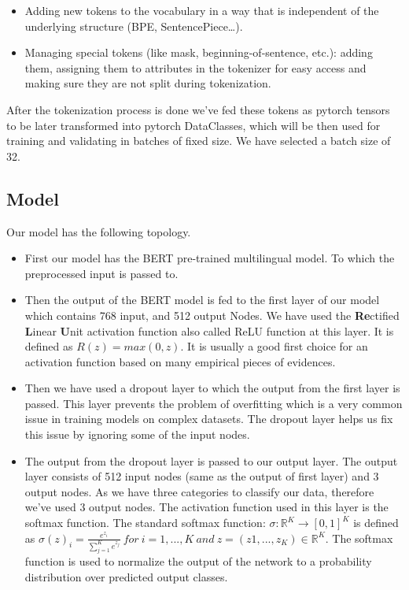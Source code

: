 \documentclass[a4paper, 12pt]{article}
\begin{document}
\begin{sloppypar}
\begin{itemize}
\item{Adding new tokens to the vocabulary in a way that is independent of the underlying structure (BPE, SentencePiece…).}\cite{noauthor_tokenizer_nodate}

\item{Managing special tokens (like mask, beginning-of-sentence, etc.): adding them, assigning them to attributes in the tokenizer for easy access and making sure they are not split during tokenization.}\cite{noauthor_tokenizer_nodate}
 \end{itemize}
 
 After the tokenization process is done we've fed these tokens as pytorch\cite{noauthor_pytorch_nodate}
  tensors to be later transformed into pytorch DataClasses, which will be then used for training and validating in batches of fixed size. We have selected a batch size of 32.
  
  \subsection{Model}
  
  Our model has the following topology.
  \begin{itemize}
  \item{First our model has the BERT pre-trained multilingual model. To which the preprocessed input is passed to.}
  
  \item{Then the output of the BERT model is fed to the first layer of our model which contains 768 input, and 512 output Nodes. We have used the \textbf{Re}ctified \textbf{L}inear \textbf{U}nit activation function also called ReLU function at this layer. It is defined as $R(z) = max(0,z)$. It is usually a good first choice for an activation function based on many empirical pieces of evidences.}
  
  \item{Then we have used a dropout layer to which the output from the first layer is passed. This layer prevents the problem of overfitting which is a very common issue in training models on complex datasets. The dropout layer helps us fix this issue by ignoring some of the input nodes. }\cite{srivastava_dropout_nodate}
  
  \item{The output from the dropout layer is passed to our output layer. The output layer consists of 512 input nodes (same as the output of first layer) and 3 output nodes. As we have three categories to classify our data, therefore we've used 3 output nodes. The activation function used in this layer is the softmax function. The standard softmax function: $ \sigma : \mathbb{R}^K \rightarrow [0,1]^K $ is defined as \large
  $\sigma(z)_i = \frac{e^{z_i}}{\sum_{j = 1} ^{ K} e^{z_j}}\  for\  i = 1, ... , K\  and\  z = (z1, ..., z_K) \in \mathbb{R}^K$. 
  \normalsize
  The softmax function is used to normalize the output of the  network to a probability distribution over predicted output classes. }\cite{noauthor_softmax_2021}
  

\end{itemize}
\end{sloppypar}
\end{document}
